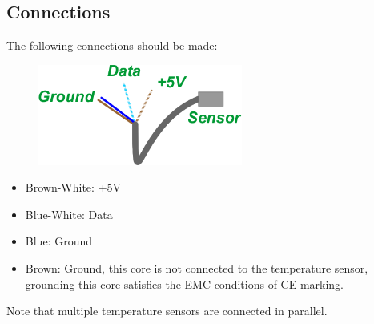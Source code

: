 \subsection{Connections}

The following connections should be made:

\begin{figure}[H]
\centering
\includegraphics[width=0.6\textwidth]{Images/TempSensor.png}
\end{figure}

	\begin{itemize}
	  
	  \item{Brown-White:} +5V
	  		
	  \item{Blue-White:} Data 

	  \item{Blue:} Ground 

	  \item{Brown:} Ground, this core is not connected to the temperature sensor,
	  		grounding this core satisfies the EMC conditions of CE marking.
	  			
	\end{itemize}


Note that multiple temperature sensors are connected in parallel.
